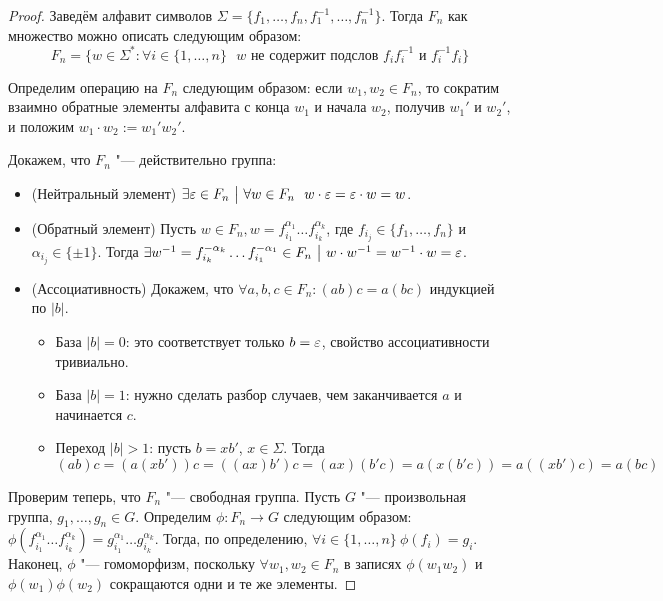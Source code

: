 \begin{proof}
	Заведём алфавит символов $\Sigma = \{f_1, \ldots, f_n, f_1^{-1}, \ldots, f_n^{-1}\}$. Тогда $F_n$ как множество можно описать следующим образом:
	\[
		F_n = \{w \in \Sigma^* \colon \forall i \in \{1, \ldots, n\} \text{ $w$ не содержит подслов $f_if_i^{-1}$ и $f_i^{-1}f_i$}\}
	\]
	
	Определим операцию на $F_n$ следующим образом: если $w_1, w_2 \in F_n$, то сократим взаимно обратные элементы алфавита с конца $w_1$ и начала $w_2$, получив $w_1'$ и $w_2'$, и положим $w_1 \cdot w_2 := w_1'w_2'$.
	
	Докажем, что $F_n$ "--- действительно группа:
	\begin{itemize}
		\item (Нейтральный элемент) $\exists \varepsilon \in F_n \ \big|\  \forall w \in F_n\ \ w \cdot \varepsilon = \varepsilon \cdot w = w$.
		\item (Обратный элемент) Пусть $w \in F_n, w = f_{i_1}^{\alpha_1}\ldots f_{i_k}^{\alpha_k}$, где $f_{i_j} \in \{f_1, \ldots, f_n\}$ и $\alpha_{i_j} \in \{\pm 1\}$. Тогда $\exists w^{-1} = f_{i_k}^{-\alpha_k} \ldots f_{i_1}^{-\alpha_1} \in F_n \ \big|\  w \cdot w^{-1} = w^{-1} \cdot w = \varepsilon$.
		\item (Ассоциативность) Докажем, что $\forall a, b, c \in F_n: (ab)c = a(bc)$ индукцией по $|b|$. 
		\begin{itemize}
			\item База $|b| = 0$: это соответствует только $b = \varepsilon$, свойство ассоциативности тривиально.
			
			\item База $|b| = 1$: нужно сделать разбор случаев, чем заканчивается $a$ и начинается $c$.
			
			\item Переход $|b| > 1$: пусть $b = xb'$, $x \in \Sigma$. Тогда
			\[
				(ab)c = (a(xb'))c = ((ax)b')c = (ax)(b'c) = a(x(b'c)) = a((xb')c) = a(bc)
			\]
			
		\end{itemize}
	\end{itemize}
	
	Проверим теперь, что $F_n$ "--- свободная группа. Пусть $G$ "--- произвольная группа, $g_1, \ldots, g_n \in G$. Определим $\phi \colon F_n \to G$ следующим образом: $\phi(f_{i_1}^{\alpha_1} \ldots f_{i_k}^{\alpha_k}) = g_{i_1}^{\alpha_1} \ldots g_{i_k}^{\alpha_k}$. Тогда, по определению, $\forall i \in \{1, \ldots, n\}\ \phi(f_i) = g_i$. Наконец, $\phi$ "--- гомоморфизм, поскольку $\forall w_1, w_2 \in F_n$ в записях $\phi(w_1w_2)$ и $\phi(w_1)\phi(w_2)$ сокращаются одни и те же элементы.
\end{proof}

